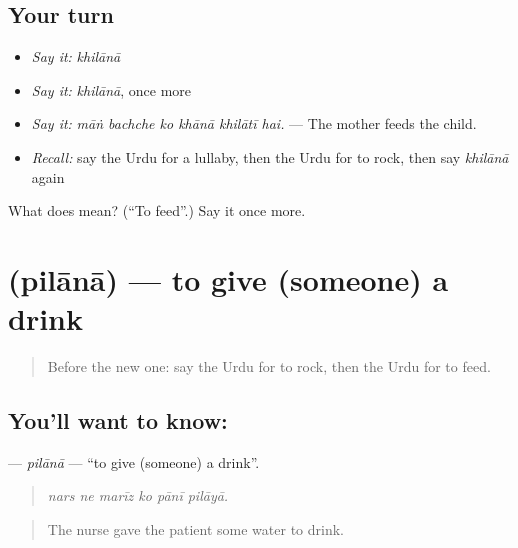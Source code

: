 \subsection*{Your turn}
\begin{itemize}
\raggedright
  \item \emph{Say it:} \emph{khilānā}
  \item \emph{Say it:} \emph{khilānā}, once more
  \item \emph{Say it:} \emph{māṅ bachche ko khānā khilātī hai.} — The mother feeds the child.
  \item \emph{Recall:} say the Urdu for a lullaby, then the Urdu for to rock, then say \emph{khilānā} again
\end{itemize}

\begin{tcolorbox}[breakable,colback=teal!4,colframe=teal!35!black,title={Before you move on}]
What does  mean? (\textquotedblleft{}To feed\textquotedblright{}.) Say it once more.
\end{tcolorbox}
\section[\texorpdfstring{\ur{پلانا} (pilānā)}{پلانا (pilānā)}]{ (pilānā) — to give (someone) a drink}

\label{lesson:UR-C484-pilana}



\begin{quote}
Before the new one: say the Urdu for to rock, then the Urdu for to feed.
\end{quote}

\subsection*{You'll want to know: }
\textbf{} — \emph{pilānā} — \textquotedblleft{}to give (someone) a drink\textquotedblright{}.

\begin{quote}
     
\end{quote}

\begin{quote}
\emph{nars ne marīz ko pānī pilāyā.}
\end{quote}

\begin{quote}
The nurse gave the patient some water to drink.
\end{quote}

